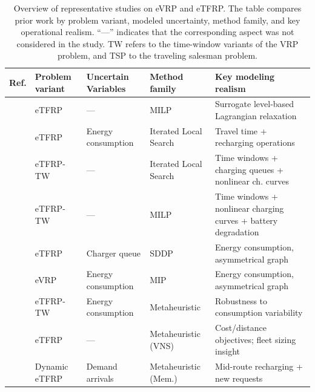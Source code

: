 \documentclass[journal]{IEEEtran}
\begin{document}
\begin{table}
\scriptsize
\centering
\setlength{\tabcolsep}{4pt}
\renewcommand{\arraystretch}{1.15}
\caption{Overview of representative studies on eVRP and eTFRP. The table compares prior work by problem variant, modeled uncertainty, method family, and key operational realism. ``---'' indicates that the corresponding aspect was not considered in the study. TW refers to the time-window variants of the VRP problem, and TSP to the traveling salesman problem.}
\label{tab:taxonomy}
\begin{tabular}{p{0.5cm}p{1.8cm}p{3.0cm}p{2.5cm}p{7cm}}
\toprule
\textbf{Ref.} &
\textbf{Problem variant} &
\textbf{Uncertain Variables} &
\textbf{Method family} &
\textbf{Key modeling realism} \\
\midrule


\cite{BRAGIN2024104494} &
eTFRP &
--- &
MILP &
Surrogate level-based Lagrangian relaxation \\

\cite{SPINELLI2026105480} &
eTFRP &
Energy consumption &
Iterated Local Search &
Travel time + recharging operations \\

\cite{WANG2025104932} &
eTFRP-TW &
--- &
Iterated Local Search &
Time windows + charging queues + nonlinear ch. curves \\

\cite{cataldo_2023} &
eTFRP-TW &
--- &
MILP &
Time windows + nonlinear charging curves + battery degradation \\

\cite{ziyan2025} &
eTFRP &
Charger queue &
SDDP &
Energy consumption, asymmetrical graph \\

\cite{WANG2024123407} &
eVRP &
Energy consumption &
MIP &
Energy consumption, asymmetrical graph \\

\midrule


\cite{AMIRI2023109108} &
eTFRP-TW &
Energy consumption &
Metaheuristic &
Robustness to consumption variability \\

\cite{euchi_hybrid_2023} &
eTFRP &
--- &
Metaheuristic (VNS) &
Cost/distance objectives; fleet sizing insight \\

\cite{dong_dynamic_2023} &
Dynamic eTFRP &
Demand arrivals &
Metaheuristic (Mem.) &
Mid-route recharging + new requests \\


\end{tabular}
\end{table}
\end{document}
